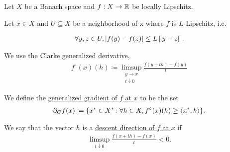 Let $X$ be a Banach space and $f: X \to \mathbb R$ be locally Lipschitz.

\begin{definition}\label{def:clarke_gradient}\cite[definition 10.3]{Clarke2013}
  Let $x \in X$ and $U \subseteq X$ be a neighborhood of x where $f$ is $L$-Lipschitz, i.e.

  \begin{align*}
    \forall y, z \in U, \left\vert f(y) - f(z) \right\vert \leq L \left\Vert y - z \right\Vert.
  \end{align*}

  We use the Clarke generalized derivative,
  \begin{align*}
    f^\circ(x)(h) \coloneqq \limsup_{\substack{y \to x \\ t \downarrow 0}} \frac {f(y + th) - f(y)} t
  \end{align*}

  We define the \uline{generalized gradient of $f$ at $x$} to be the set
  \begin{align*}
    \partial_C f(x) \coloneqq \{ x^* \in X^* \colon \forall h \in X, f^\circ(x)(h) \geq \left\langle x^*, h \right\rangle \}.
  \end{align*}

  We say that the vector $h$ is a \uline{descent direction of $f$ at $x$} if
  \begin{align*}
    \limsup_{t \downarrow 0} \frac {f(x + th) - f(x)} t < 0.
  \end{align*}
\end{definition}

